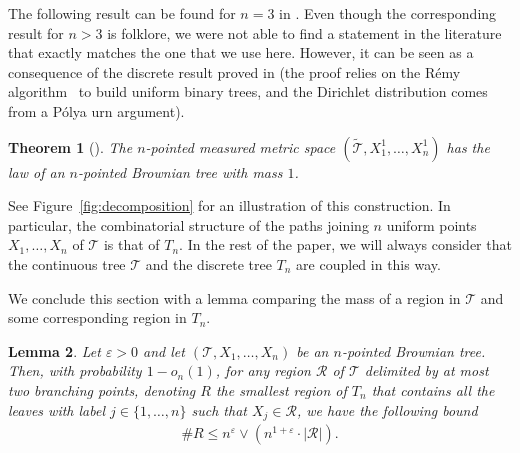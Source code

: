 \documentclass[JEP,XML,SOM,Unicode,NoFloatCountersInSection,published]{cedram}
\newcommand{\Tt}{\mathcal{T}}
\newcommand{\Rr}{\mathcal{R}}
\let\eps\varepsilon
\theoremstyle{plain}
\newtheorem{theorem}{Theorem}
\newtheorem{lemma}[theorem]{Lemma}
\theoremstyle{definition}
\begin{document}
The following result can be found for $n=3$ in \cite{aldous_recursive_1994}.
Even though the corresponding result for $n>3$ is folklore, we were not able to find a statement in the literature that exactly matches the one that we use here. However, it can be seen as a consequence of the discrete result proved in \cite[Ex.\,7.4.12 and Ex.\,7.4.13]{pitman_combinatorial_2006} (the proof relies on the Rémy algorithm~\cite{Rem85} to build uniform binary trees, and the Dirichlet distribution comes from a Pólya urn argument).
\begin{theorem}[\cite{aldous_recursive_1994,pitman_combinatorial_2006}]\label{thm_discrete_continuous_coupling}
The $n$-pointed measured metric space $( \widetilde{\Tt}, X_1^1, \dots, X_n^1)$ has the law of an $n$-pointed Brownian tree with mass $1$.
\end{theorem}
See Figure~\ref{fig:decomposition} for an illustration of this construction.
In particular, the combinatorial structure of the paths joining $n$ uniform points $X_1, \dots, X_n$ of $\Tt$ is that of $T_n$.
In the rest of the paper, we will always consider that the continuous tree $\Tt$ and the discrete tree $T_n$ are coupled in this way.

We conclude this section with a lemma comparing the mass of a region in $\Tt$ and some corresponding region in $T_n$.
\begin{lemma}\label{lem:comparison mass vs leaf-count}
Let $\eps>0$ and let $\left( \Tt, X_1, \dots, X_n \right)$ be an $n$-pointed Brownian tree.
Then, with probability $1 - o_n(1)$, for any region $\Rr$ of $\Tt$ delimited by at most two branching points,
denoting $R$ the smallest region of $T_n$ that contains all the leaves with label $j \in \{1,\dots,n\}$ such that $X_j \in \Rr$, we have the following bound
\begin{align*}
\#R \leq n^\eps \vee (n^{1+\eps} \cdot |\Rr|).
\end{align*}
\end{lemma}
\end{document}
